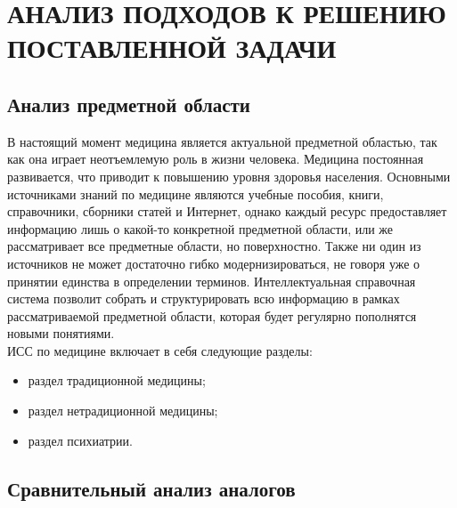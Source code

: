\section{АНАЛИЗ ПОДХОДОВ К РЕШЕНИЮ ПОСТАВЛЕННОЙ ЗАДАЧИ}
\label{sec:domain}
\subsection{Анализ предметной области}
В настоящий момент медицина является актуальной предметной областью, так как она играет неотъемлемую роль в жизни человека. Медицина постоянная развивается, что приводит к повышению уровня здоровья населения. Основными источниками знаний по медицине являются учебные пособия, книги, справочники, сборники статей и Интернет, однако каждый ресурс предоставляет информацию лишь о какой-то конкретной предметной области, или же рассматривает все предметные области, но поверхностно. Также ни один из источников не может достаточно гибко модернизироваться, не говоря уже о принятии единства в определении терминов. Интеллектуальная справочная система позволит собрать и структурировать всю информацию в рамках рассматриваемой предметной области, которая будет регулярно пополнятся новыми понятиями.\\
ИСС по медицине включает в себя следующие разделы:
\begin{itemize}
    \item раздел традиционной медицины;
    \item раздел нетрадиционной медицины;
    \item раздел психиатрии.\\
\end{itemize}{}


\subsection{Сравнительный анализ аналогов}
 
